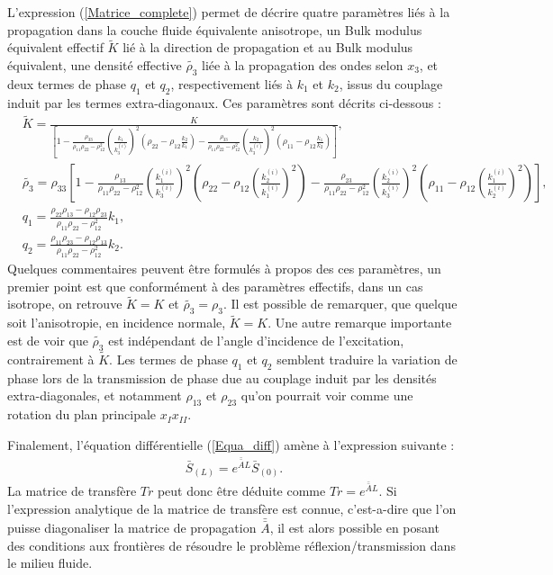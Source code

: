 \documentclass[12pt]{report}
\begin{document}
	L'expression (\ref{Matrice_complete}) permet de décrire quatre paramètres liés à la propagation dans la couche fluide équivalente anisotrope, un Bulk modulus équivalent effectif $\tilde{K}$ lié à la direction de propagation et au Bulk modulus équivalent, une densité effective $\tilde{\rho_3}$ liée à la propagation des ondes selon $x_3$, et deux termes de phase $q_1$ et $q_2$, respectivement liés à $k_1$ et $k_2$, issus du couplage induit par les termes extra-diagonaux. Ces paramètres sont décrits ci-dessous :
    \begin{align}
     &\tilde{K}=\frac{K}{[1-\frac{\rho_{33}}{\rho_{11}\rho_{22}-\rho_{12}^2}(\frac{k_1}{k_3^{(i)}})^2(\rho_{22}-\rho_{12}\frac{k_2}{k_1})-\frac{\rho_{33}}{\rho_{11}\rho_{22}-\rho_{12}^2}(\frac{k_2}{k_3^{(i)}})^2(\rho_{11}-\rho_{12}\frac{k_1}{k_2})]}\label{Ktild},\\
     &\tilde{\rho_3}=\rho_{33}[1-\frac{\rho_{13}}{\rho_{11}\rho_{22}-\rho_{12}^2}(\frac{k_1^{(i)}}{k_3^{(i)}})^2(\rho_{22}-\rho_{12}(\frac{k_2^{(i)}}{k_1^{(i)}})^2)-\frac{\rho_{23}}{\rho_{11}\rho_{22}-\rho_{12}^2}(\frac{k_2^{(i)}}{k_3^{(i)}})^2(\rho_{11}-\rho_{12}(\frac{k_1^{(i)}}{k_2^{(i)}})^2)]\label{rho3tild}, \\
	&q_{1}=\frac{\rho_{22}\rho_{13}-\rho_{12}\rho_{23}}{\rho_{11}\rho_{22}-\rho_{12}^2}k_1\label{q1},\\
    &q_{2}= \frac{\rho_{11}\rho_{23}-\rho_{12}\rho_{13}}{\rho_{11}\rho_{22}-\rho_{12}^2}k_2\label{q2}.
          \end{align}
    Quelques commentaires peuvent être formulés à propos des ces paramètres, un premier point est que conformément à des paramètres effectifs, dans un cas isotrope, on retrouve  $\tilde{K}=K$ et $\tilde{\rho_3}=\rho_3$. Il est possible de remarquer, que quelque soit l'anisotropie, en incidence normale, $\tilde{K}=K$. Une autre remarque importante est de voir que $\tilde{\rho_3}$ est indépendant de l'angle d'incidence de l'excitation, contrairement à $\tilde{K}$. Les termes de phase $q_1$ et $q_2$ semblent traduire la variation de phase lors de la transmission de phase due au couplage induit par les densités extra-diagonales, et notamment $\rho_{13}$ et $\rho_{23}$  qu'on pourrait voir comme une rotation du plan principale $x_Ix_{II}$.
    
    Finalement, l'équation différentielle (\ref{Equa_diff}) amène à l'expression suivante : 
    \begin{align}
    \bar{S}_{(L)}=e^{\bar{\bar{A}}L}\bar{S}_{(0)}.\label{PB}
    \end{align}
    La matrice de transfère $Tr$ peut donc être déduite comme $Tr=e^{\bar{\bar{A}}L}$. Si l'expression analytique de la matrice de transfère est connue, c'est-a-dire que l'on puisse diagonaliser la matrice de propagation $\bar{\bar{A}}$, il est alors possible en posant des conditions aux frontières de résoudre le problème réflexion/transmission dans le milieu fluide.
    
\end{document}
